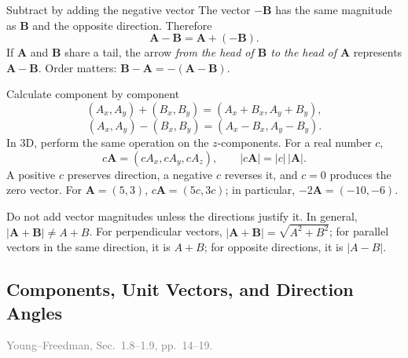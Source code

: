 \documentclass[11pt,letterpaper]{article}
\newcommand{\vect}[1]{\boldsymbol{#1}}
\newcommand{\bookref}[2]{\textcolor{gray}{\footnotesize Young--Freedman, Sec.~#1, pp.~#2.}}
\begin{document}
\begin{center}
\end{center}

\begin{defbox}{Subtract by adding the negative vector}
The vector $-\vect B$ has the same magnitude as $\vect B$ and the opposite direction. Therefore
\[
 \boxed{\vect A-\vect B=\vect A+(-\vect B).}
\]
If $\vect A$ and $\vect B$ share a tail, the arrow \emph{from the head of $\vect B$ to the head of $\vect A$} represents $\vect A-\vect B$. Order matters:
$\vect B-\vect A=-(\vect A-\vect B)$.
\end{defbox}

\begin{rulebox}{Calculate component by component}
\[
 (A_x,A_y)+(B_x,B_y)=(A_x+B_x,A_y+B_y),
\]
\[
 (A_x,A_y)-(B_x,B_y)=(A_x-B_x,A_y-B_y).
\]
In 3D, perform the same operation on the $z$-components. For a real number $c$,
\[
 c\vect A=(cA_x,cA_y,cA_z),\qquad |c\vect A|=|c|\,|\vect A|.
\]
A positive $c$ preserves direction, a negative $c$ reverses it, and $c=0$ produces the zero vector. For $\vect A=(5,3)$, $c\vect A=(5c,3c)$; in particular, $-2\vect A=(-10,-6)$.
\end{rulebox}

\begin{watchbox}
Do not add vector magnitudes unless the directions justify it. In general,
$|\vect A+\vect B|\ne A+B$. For perpendicular vectors,
$|\vect A+\vect B|=\sqrt{A^2+B^2}$; for parallel vectors in the same direction, it is $A+B$; for opposite directions, it is $|A-B|$.
\end{watchbox}

\subsection{Components, Unit Vectors, and Direction Angles}
\bookref{1.8--1.9}{14--19}
\end{document}
